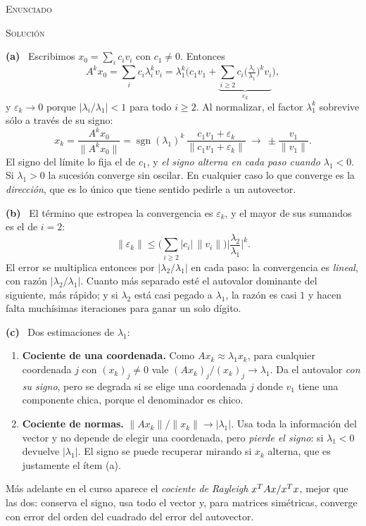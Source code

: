 \documentclass[11pt,a4paper]{article}
\newcommand{\bi}[1]{\boldsymbol{#1}}
\newcommand{\n}[1]{\boldsymbol{#1}}
\DeclareMathOperator{\gen}{span}
\DeclareMathOperator{\tr}{tr}
\DeclareMathOperator{\rg}{rg}
\DeclareMathOperator{\sgn}{sgn}
\def\n#1{#1}\def\bi#1{#1}\def\rg{rg}\def\tr{tr}\def\gen{span}%
\newcounter{entrega}[section]
\newenvironment{enunciado}{%
  \begin{enunciadobox}%
  \noindent\textsc{Enunciado}\par\smallskip\noindent\ignorespaces}%
  {\end{enunciadobox}}
\newcommand{\solucion}{\par\medskip\noindent\textsc{Solución}\par\nobreak\smallskip\noindent}
\newcommand{\itemsol}[1]{\par\medskip\noindent\textbf{(#1)}\ \ignorespaces}
\begin{document}
\begin{enunciado}
\medskip
{}
\end{enunciado}
\solucion
\itemsol{a} Escribimos $\n x_0=\sum_ic_i\n v_i$ con $c_1\neq0$. Entonces
\[
A^k\n x_0=\sum_i c_i\lambda_i^{k}\n v_i
=\lambda_1^{k}\Big(c_1\n v_1+\underbrace{\sum_{i\ge2}c_i
\big(\tfrac{\lambda_i}{\lambda_1}\big)^{k}\n v_i}_{\varepsilon_k}\Big),
\]
y $\varepsilon_k\to\n0$ porque $|\lambda_i/\lambda_1|<1$ para todo $i\ge2$. Al
normalizar, el factor $\lambda_1^k$ sobrevive sólo a través de su signo:
\[
\n x_k=\frac{A^k\n x_0}{\|A^k\n x_0\|}
=\sgn(\lambda_1)^{k}\,
 \frac{c_1\n v_1+\varepsilon_k}{\|c_1\n v_1+\varepsilon_k\|}
\ \longrightarrow\ \pm\frac{\n v_1}{\|\n v_1\|} .
\]
El signo del límite lo fija el de $c_1$, y \emph{el signo alterna en cada paso
cuando $\lambda_1<0$}. Si $\lambda_1>0$ la sucesión converge sin oscilar. En
cualquier caso lo que converge es la \emph{dirección}, que es lo único que tiene
sentido pedirle a un autovector.

\itemsol{b} El término que estropea la convergencia es $\varepsilon_k$, y el
mayor de sus sumandos es el de $i=2$:
\[
\|\varepsilon_k\|\le\Big(\sum_{i\ge2}|c_i|\,\|\n v_i\|\Big)
\Big|\frac{\lambda_2}{\lambda_1}\Big|^{k}.
\]
El error se multiplica entonces por $|\lambda_2/\lambda_1|$ en cada paso: la
convergencia es \emph{lineal}, con razón $|\lambda_2/\lambda_1|$. Cuanto más
separado esté el autovalor dominante del siguiente, más rápido; y si $\lambda_2$
está casi pegado a $\lambda_1$, la razón es casi $1$ y hacen falta muchísimas
iteraciones para ganar un solo dígito.

\itemsol{c} Dos estimaciones de $\lambda_1$:
\begin{enumerate}[label=\textup{(\arabic*)},itemsep=3pt,topsep=4pt]
\item \textbf{Cociente de una coordenada.} Como $A\n x_k\approx\lambda_1\n x_k$,
para cualquier coordenada $j$ con $(\n x_k)_j\neq0$ vale
$(A\n x_k)_j/(\n x_k)_j\to\lambda_1$. Da el autovalor \emph{con su signo}, pero
se degrada si se elige una coordenada $j$ donde $\n v_1$ tiene una componente
chica, porque el denominador es chico.
\item \textbf{Cociente de normas.} $\|A\n x_k\|/\|\n x_k\|\to|\lambda_1|$. Usa
toda la información del vector y no depende de elegir una coordenada, pero
\emph{pierde el signo}: si $\lambda_1<0$ devuelve $|\lambda_1|$. El signo se
puede recuperar mirando si $\n x_k$ alterna, que es justamente el ítem (a).
\end{enumerate}
Más adelante en el curso aparece el \emph{cociente de Rayleigh}
$\bx^TA\bx/\bx^T\bx$, mejor que las dos: conserva el signo, usa todo el vector
y, para matrices simétricas, converge con error del orden del cuadrado del error
del autovector.
\end{document}
